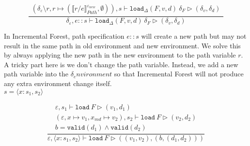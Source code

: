 \documentclass[10pt,twoside,a4paper]{article}
\theoremstyle{theorem}
\theoremstyle{lemma}
\theoremstyle{property}
\theoremstyle{definition}
\theoremstyle{assumption}
\begin{document}
\begin{displaymath}
	\frac{\begin{array}{c}
		(\delta_\varepsilon \setminus r, r \mapsto (\llbracket r/e \rrbracket^{\varepsilon_{new}}_{Path},\emptyset)) , s \vdash \mathtt{load}_\Delta (F,v,d)~ \delta_F \rhd (\delta_v,\delta_d)
	\end{array}}
	{
		\delta_\varepsilon, e::s \vdash \mathtt{load}_\Delta (F,v,d)~ \delta_F \rhd (\delta_v,\delta_d)
	}
\end{displaymath}

In Incremental Forest, path specification $e\!::\!s$ will create a new path but may not result in the same path in old environment and new environment. 
We solve this by always applying the new path in the new environment to the path variable $r$. A tricky part here is we don't change the path variable. Instead, we add a new path variable into the $\delta_environment$ so that Incremental Forest will not produce any extra environment change itself.\\

$\boxed{s = \langle x : s_1, s_2 \rangle}$

\begin{displaymath}
	\frac{\begin{array}{c}
		\varepsilon, s_1 \vdash \mathtt{load}~F \rhd (v_1,d_1)\\
		(\varepsilon, x \mapsto v_1, x_{md} \mapsto v_2), s_2 \vdash \mathtt{load}~F \rhd (v_2,d_2)\\
		b = \mathtt{valid}(d_1) \land \mathtt{valid}(d_2)
	\end{array}}
	{\varepsilon, \langle x : s_1, s_2 \rangle \vdash \mathtt{load}~F \rhd ((v_1, v_2),(b,(d_1,d_2))) }
\end{displaymath}
\end{document}
